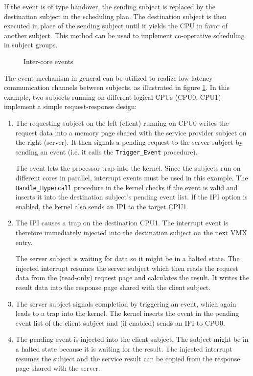 If the event is of type handover, the sending subject is replaced by the
destination subject in the scheduling plan. The destination subject is then
executed in place of the sending subject until it yields the CPU in favor of
another subject. This method can be used to implement co-operative scheduling
in subject groups.

\begin{figure}[h]
	\centering
	
	\caption{Inter-core events}
	\label{fig:inter-core-events}
\end{figure}

The event mechanism in general can be utilized to realize low-latency
communication channels between subjects, as illustrated in figure
\ref{fig:inter-core-events}. In this example, two subjects running on different
logical CPUs (CPU0, CPU1) implement a simple request-response design:

\begin{enumerate}
	\item The requesting subject on the left (client) running on CPU0 writes
		the request data into a memory page shared with the service provider
		subject on the right (server). It then signals a pending request to the
		server subject by sending an event (i.e. it calls the
		\texttt{Trigger\_Event} procedure).

		The event lets the processor trap into the kernel. Since the subjects
		run on different cores in parallel, interrupt events must be used in
		this example. The \texttt{Handle\_Hypercall} procedure in the kernel
		checks if the event is valid and inserts it into the destination
		subject's pending event list. If the IPI option is enabled, the kernel
		also sends an IPI to the target CPU1.
	\item The IPI causes a trap on the destination CPU1. The interrupt
		event is therefore immediately injected into the destination subject on
		the next VMX entry.

		The server subject is waiting for data so it might be in a halted
		state.  The injected interrupt resumes the server subject which then
		reads the request data from the (read-only) request page and calculates
		the result. It writes the result data into the response page shared
		with the client subject.
	\item The server subject signals completion by triggering an event, which
		again leads to a trap into the kernel. The kernel inserts the event in
		the pending event list of the client subject and (if enabled) sends an
		IPI to CPU0.
	\item The pending event is injected into the client subject. The subject
		might be in a halted state because it is waiting for the result. The
		injected interrupt resumes the subject and the service result can be
		copied from the response page shared with the server.
\end{enumerate}

